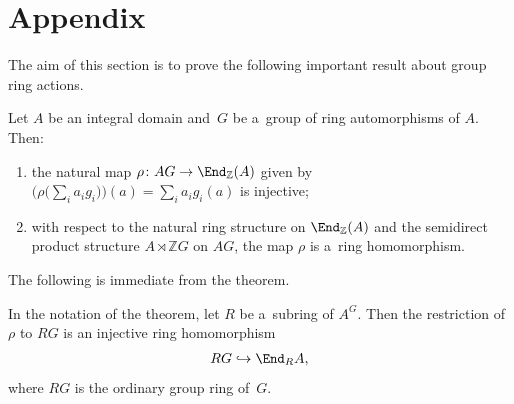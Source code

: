 \section{Appendix}

The aim of this section is to prove the following important result about group ring actions.

\begin{Theorem}
\label{thm:Premet}

Let $A$ be an integral domain and~$G$ be a~group of ring automorphisms of $A$.
Then:
\begin{enumerate}\itemsep=0pt
\item[$(a)$] the natural map $\rho\colon AG \to \End_\mathbb Z(A)$ given by $\big(\rho\big(\sum\limits_i a_i g_i\big)\big)(a)=\sum\limits_i a_i g_i(a)$ is injective;
\item[$(b)$] with respect to the natural ring structure on $\End_\mathbb Z(A)$ and the semidirect product structure $A\rtimes
\mathbb Z G$ on $AG$, the map $\rho$ is a~ring homomorphism.
\end{enumerate}
\end{Theorem}

The following is immediate from the theorem.

\begin{Corollary}
\label{cor:premet-dedekind}
In the notation of the theorem, let $R$ be a~subring of $A^G$.
Then the restriction of $\rho$ to $RG$ is an injective ring homomorphism
\begin{gather*}
RG\hookrightarrow \End_R A,
\end{gather*}
where $RG$ is the ordinary group ring of~$G$.
\end{Corollary}


